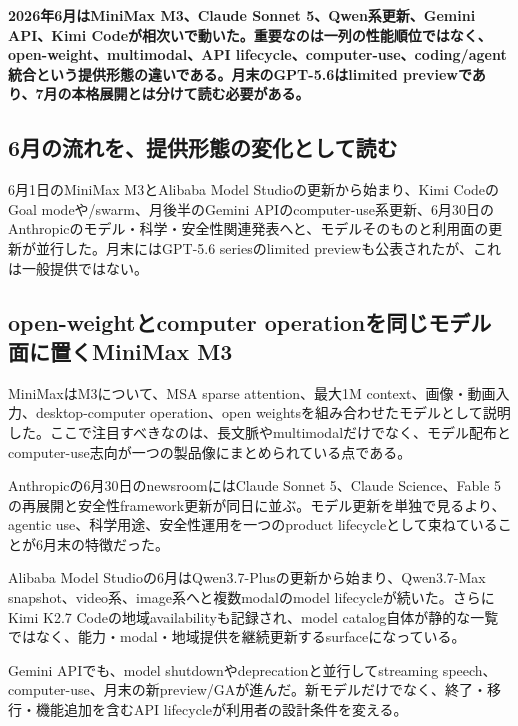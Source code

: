 \noindent\textbf{2026年6月はMiniMax M3、Claude Sonnet 5、Qwen系更新、Gemini API、Kimi Codeが相次いで動いた。重要なのは一列の性能順位ではなく、open-weight、multimodal、API lifecycle、computer-use、coding/agent統合という提供形態の違いである。月末のGPT-5.6はlimited previewであり、7月の本格展開とは分けて読む必要がある。}\autocite{src-9191d43918fc,src-a24fd97eb3d0,src-d8e13386974c,src-eac8dfbeb78c,src-f6aa679babd7}

\subsection{6月の流れを、提供形態の変化として読む}

6月1日のMiniMax M3とAlibaba Model Studioの更新から始まり、Kimi CodeのGoal modeや/swarm、月後半のGemini APIのcomputer-use系更新、6月30日のAnthropicのモデル・科学・安全性関連発表へと、モデルそのものと利用面の更新が並行した。月末にはGPT-5.6 seriesのlimited previewも公表されたが、これは一般提供ではない。\autocite{src-30f48121decc,src-9191d43918fc,src-a24fd97eb3d0,src-d8e13386974c,src-eac8dfbeb78c,src-f6aa679babd7}


\subsection{open-weightとcomputer operationを同じモデル面に置くMiniMax M3}

MiniMaxはM3について、MSA sparse attention、最大1M context、画像・動画入力、desktop-computer operation、open weightsを組み合わせたモデルとして説明した。ここで注目すべきなのは、長文脈やmultimodalだけでなく、モデル配布とcomputer-use志向が一つの製品像にまとめられている点である。\autocite{src-d8e13386974c}


Anthropicの6月30日のnewsroomにはClaude Sonnet 5、Claude Science、Fable 5の再展開と安全性framework更新が同日に並ぶ。モデル更新を単独で見るより、agentic use、科学用途、安全性運用を一つのproduct lifecycleとして束ねていることが6月末の特徴だった。\autocite{src-f6aa679babd7}


Alibaba Model Studioの6月はQwen3.7-Plusの更新から始まり、Qwen3.7-Max snapshot、video系、image系へと複数modalのmodel lifecycleが続いた。さらにKimi K2.7 Codeの地域availabilityも記録され、model catalog自体が静的な一覧ではなく、能力・modal・地域提供を継続更新するsurfaceになっている。\autocite{src-eac8dfbeb78c}


Gemini APIでも、model shutdownやdeprecationと並行してstreaming speech、computer-use、月末の新preview/GAが進んだ。新モデルだけでなく、終了・移行・機能追加を含むAPI lifecycleが利用者の設計条件を変える。\autocite{src-a24fd97eb3d0}


